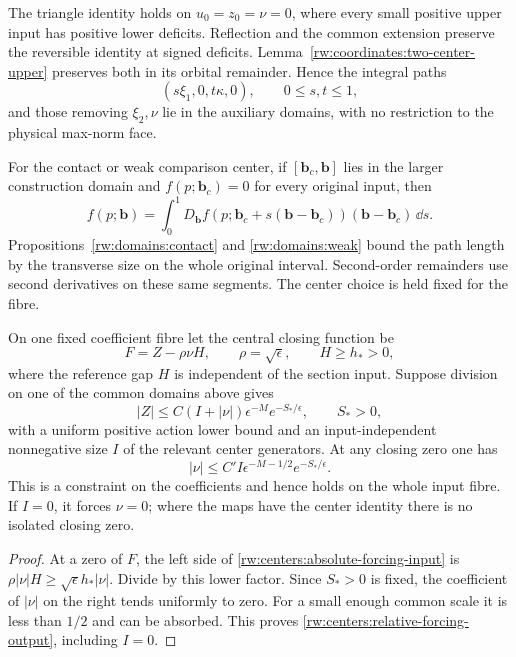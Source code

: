 The triangle identity holds on $u_0=z_0=\nu=0$, where every small
positive upper input has positive lower deficits. Reflection and the
common extension preserve the reversible identity at signed deficits.
Lemma~\ref{rw:coordinates:two-center-upper} preserves both in its
orbital remainder. Hence the integral paths
\[
 (s\xi_1,0,t\kappa,0),\qquad 0\le s,t\le1,
\]
and those removing $\xi_2,\nu$ lie in the auxiliary domains,
with no restriction to the physical max-norm face.

For the contact or weak comparison center, if
$[\mathbf b_c,\mathbf b]$ lies in the larger construction domain
and $f(p;\mathbf b_c)=0$ for every original input, then
\begin{equation}\label{rw:centers:one-center-taylor}
 f(p;\mathbf b)=
 \int_0^1D_{\mathbf b}f
       (p;\mathbf b_c+s(\mathbf b-\mathbf b_c))
       (\mathbf b-\mathbf b_c)\,\dd s.
\end{equation}
Propositions~\ref{rw:domains:contact} and \ref{rw:domains:weak}
bound the path length by the transverse size on the whole original
interval. Second-order remainders use second derivatives on these
same segments. The center choice is held fixed for the fibre.

\begin{lemma}
\label{rw:centers:relative-forcing}
On one fixed coefficient fibre let the central closing function be
\[
 F=Z-\rho\nu H,\qquad \rho=\sqrt\epsilon,
 \qquad H\ge h_*>0,
\]
where the reference gap $H$ is independent of the section input.
Suppose division on one of the common domains above gives
\begin{equation}\label{rw:centers:absolute-forcing-input}
 |Z|\le C(I+|\nu|)\epsilon^{-M}e^{-S_*/\epsilon},
 \qquad S_*>0,
\end{equation}
with a uniform positive action lower bound and an input-independent
nonnegative size $I$ of the relevant center generators. At any closing
zero one has
\begin{equation}\label{rw:centers:relative-forcing-output}
 |\nu|\le C' I\epsilon^{-M-1/2}e^{-S_*/\epsilon}.
\end{equation}
This is a constraint on the coefficients and hence holds on the whole
input fibre. If $I=0$, it forces $\nu=0$; where the maps have the
center identity there is no isolated closing zero.
\end{lemma}

\begin{proof}
At a zero of $F$, the left side of
\eqref{rw:centers:absolute-forcing-input} is
$\rho|\nu|H\ge\sqrt\epsilon h_*|\nu|$. Divide by this lower
factor. Since $S_*>0$ is fixed, the coefficient of $|\nu|$ on the
right tends uniformly to zero. For a small enough common scale it
is less than $1/2$ and can be absorbed. This proves
\eqref{rw:centers:relative-forcing-output}, including $I=0$.
\end{proof}


